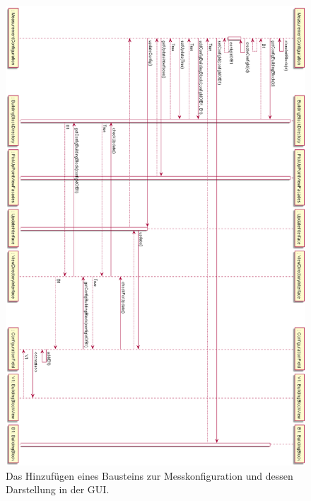 \documentclass[parskip=full]{scrartcl}
\begin{document}
\begin{figure}[htbp]
	\begin{center}
		\includegraphics[width = 16cm]{Grafiken/SeqAddBPart2.png}
		\caption{Das Hinzufügen eines Bausteins zur Messkonfiguration und dessen Darstellung in der GUI.}
		\label{SeqAddBPart2}
	\end{center}
\end{figure}
\end{document}
